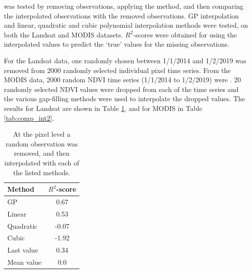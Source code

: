 \documentclass[review]{elsarticle}
\begin{document}
 was tested by removing observations, applying the method, and then comparing the interpolated observations with the removed observations. GP interpolation and linear, quadratic and cubic polynomial interpolation methods were tested, on both the Landsat and MODIS datasets. $R^2$-scores were obtained for using the interpolated values to predict the `true' values for the missing observations.


For the Landsat data, one randomly chosen  between 1/1/2014 and 1/2/2019 was removed from  2000 randomly selected individual pixel time series.
From the MODIS data, 2000 random  NDVI time series (1/1/2014 to 1/2/2019) were . 20 randomly selected NDVI values were dropped from each of the time series and the various gap-filling methods were used to interpolate the dropped values. The results for Landsat are shown in Table \ref{tab:comp_int}, and for MODIS in Table \ref{tab:comp_int2}. 



\begin{table}
	\caption{ At the pixel level a random observation was removed, and then interpolated with each of the listed methods.} \label{tab:comp_int}
	\centering
	\begin{tabular}{lc} 
		\toprule
		\textbf{Method}  & \textbf{$R^2$-score} \\
		\midrule
		GP & 0.67 \\
		Linear & 0.53 \\
		Quadratic & -0.07 \\
		Cubic & -1.92 \\
		Last value & 0.34 \\
		Mean value & 0.0 \\
		\bottomrule
	\end{tabular}
\end{table}
\end{document}
